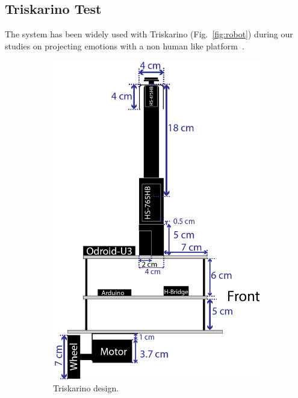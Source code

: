 \subsection{Triskarino Test}
The system has been widely used with Triskarino (Fig.~\ref{fig:robot}) during our studies on projecting emotions with a non human like platform~\cite{angel2017robots}. 
\begin{figure}
	\centering
	\begin{subfigure}[c]{0.2\textwidth}
	\includegraphics[width=\textwidth]{./Images/upperFourthD.png}
	\caption{Triskarino design.}
	\label{fig:design}
	\end{subfigure}
	\begin{subfigure}[c]{0.2\textwidth}

\end{subfigure}
\end{figure}
